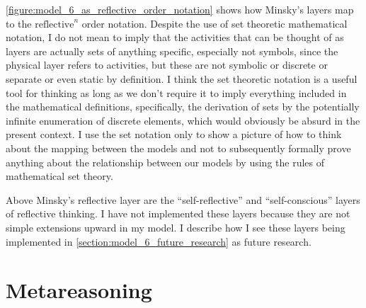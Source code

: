 \autoref{figure:model_6_as_reflective_order_notation} shows how
Minsky's layers map to the $\text{reflective}^n$ order notation.
Despite the use of set theoretic mathematical notation, I do not mean
to imply that the activities that can be thought of as layers are
actually sets of anything specific, especially not symbols, since the
physical layer refers to activities, but these are not symbolic or
discrete or separate or even static by definition.  I think the set
theoretic notation is a useful tool for thinking as long as we don't
require it to imply everything included in the mathematical
definitions, specifically, the derivation of sets by the potentially
infinite enumeration of discrete elements, which would obviously be
absurd in the present context.  I use the set notation only to show a
picture of how to think about the mapping between the models and not
to subsequently formally prove anything about the relationship between
our models by using the rules of mathematical set theory.

Above Minsky's reflective layer are the ``self-reflective'' and
``self-conscious'' layers of reflective thinking.  I have not
implemented these layers because they are not simple extensions upward
in my model.  I describe how I see these layers being implemented in
\autoref{section:model_6_future_research} as future research.

\section{Metareasoning}

